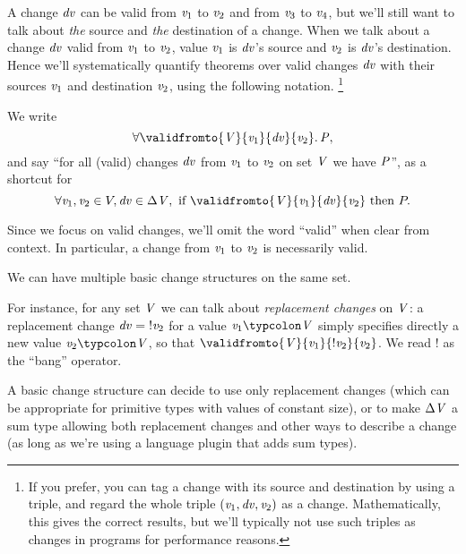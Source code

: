 A change \ensuremath{\Varid{dv}} can be valid from \ensuremath{\Varid{v}_{1}} to \ensuremath{\Varid{v}_{2}} and from \ensuremath{\Varid{v}_{3}} to \ensuremath{\Varid{v}_{4}}, but we'll
still want to talk about \emph{the} source and \emph{the} destination of a
change. When we talk about a change \ensuremath{\Varid{dv}} valid from \ensuremath{\Varid{v}_{1}} to \ensuremath{\Varid{v}_{2}}, value \ensuremath{\Varid{v}_{1}} is
\ensuremath{\Varid{dv}}'s source and \ensuremath{\Varid{v}_{2}} is \ensuremath{\Varid{dv}}'s destination. Hence we'll systematically quantify
theorems over valid changes \ensuremath{\Varid{dv}} with their sources \ensuremath{\Varid{v}_{1}} and destination \ensuremath{\Varid{v}_{2}},
using the following notation.%
\footnote{If you prefer, you can tag a change with its source and destination by
  using a triple, and regard the whole triple \ensuremath{(\Varid{v}_{1},\Varid{dv},\Varid{v}_{2})} as a change.
  Mathematically, this gives the correct results, but we'll typically not use
  such triples as changes in programs for performance reasons.}
\begin{notation}
  We write \[\ensuremath{\forall \validfromto{\Conid{V}}{\Varid{v}_{1}}{\Varid{dv}}{\Varid{v}_{2}}\hsforall \hsdot{\circ }{\mathpunct{.}}\Conid{P}},\] and say ``for all (valid)
  changes \ensuremath{\Varid{dv}} from \ensuremath{\Varid{v}_{1}} to \ensuremath{\Varid{v}_{2}} on set \ensuremath{\Conid{V}} we have \ensuremath{\Conid{P}}'', as a shortcut for
  \[\ensuremath{\forall \Varid{v}_{1}\hsforall ,\Varid{v}_{2}\in } V, \ensuremath{\Varid{dv}\in \Delta \Conid{V},}\text{ if }\ensuremath{\validfromto{\Conid{V}}{\Varid{v}_{1}}{\Varid{dv}}{\Varid{v}_{2}}}\text{ then }P.\]

  Since we focus on valid changes, we'll omit the word ``valid'' when clear from context.
  In particular, a change from \ensuremath{\Varid{v}_{1}} to \ensuremath{\Varid{v}_{2}} is necessarily valid.
\end{notation}

We can have multiple basic change structures on the same set.
\begin{example}
\label{ex:replacement}
For instance, for any set \ensuremath{\Conid{V}} we can talk about \emph{replacement changes} on
\ensuremath{\Conid{V}}: a replacement change \ensuremath{\Varid{dv}\mathrel{=}\mathbin{!}\Varid{v}_{2}} for a value \ensuremath{\Varid{v}_{1}\typcolon\Conid{V}} simply specifies
directly a new value \ensuremath{\Varid{v}_{2}\typcolon\Conid{V}}, so that \ensuremath{\validfromto{\Conid{V}}{\Varid{v}_{1}}{\mathbin{!}\Varid{v}_{2}}{\Varid{v}_{2}}}. We read \ensuremath{\mathbin{!}} as
the ``bang'' operator.

A basic change structure can decide to use only replacement changes (which can
be appropriate for primitive types with values of constant size), or to make
\ensuremath{\Delta \Conid{V}} a sum type allowing both replacement changes and other ways to describe a
change (as long as we're using a language plugin that adds sum types).
\end{example}

